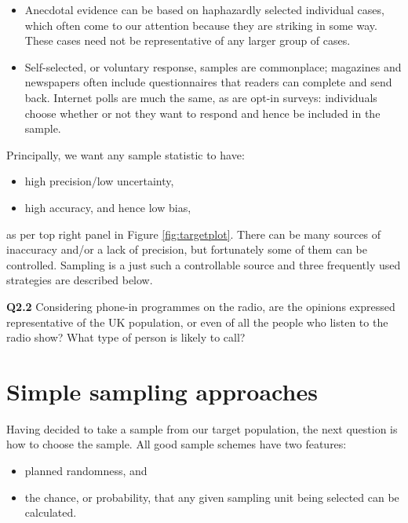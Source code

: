 \documentclass[
  oneside]{krantz}
\begin{document}
\begin{itemize}
\item
  Anecdotal evidence can be based on haphazardly selected individual cases, which often come to our attention because they are striking in some way. These cases need not be representative of any larger group of cases.
\item
  Self-selected, or voluntary response, samples are commonplace; magazines and newspapers often include questionnaires that readers can complete and send back. Internet polls are much the same, as are opt-in surveys: individuals choose whether or not they want to respond and hence be included in the sample.
\end{itemize}

Principally, we want any sample statistic to have:

\begin{itemize}
\item
  high precision/low uncertainty,
\item
  high accuracy, and hence low bias,
\end{itemize}

as per top right panel in Figure \ref{fig:targetplot}. There can be many sources of inaccuracy and/or a lack of precision, but fortunately some of them can be controlled. Sampling is a just such a controllable source and three frequently used strategies are described below.

\textbf{Q2.2} Considering phone-in programmes on the radio, are the opinions expressed representative of the UK population, or even of all the people who listen to the radio show? What type of person is likely to call?

\hypertarget{simple-sampling-approaches}{%
\section{Simple sampling approaches}\label{simple-sampling-approaches}}

Having decided to take a sample from our target population, the next question is how to choose the sample. All good sample schemes have two features:

\begin{itemize}
\item
  planned randomness, and
\item
  the chance, or probability, that any given sampling unit being selected can be calculated.
\end{itemize}
\end{document}

